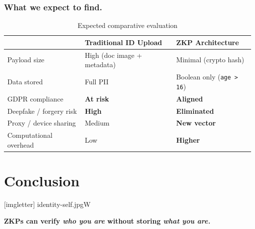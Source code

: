 \documentclass[aspectratio=169]{beamer}
\begin{document}
    \begin{frame}
        \frametitle{What we expect to find.}
        
        \begin{table}
            \small
            \begin{tabular}{p{3.8cm} p{3.6cm} p{3.6cm}}
                
                & \textbf{Traditional ID Upload} & \textbf{ZKP Architecture} \\
                \midrule
                Payload size                    & High (doc image + metadata)   & Minimal (crypto hash) \\
                \midrule
                Data stored         & Full PII                      & Boolean only (\texttt{age > 16}) \\
                \midrule
                GDPR compliance                 & \textcolor{hgpink}{\textbf{At risk}} & \textcolor{hgdarkgreen}{\textbf{Aligned}} \\
                \midrule
                Deepfake / forgery risk         & \textcolor{hgpink}{\textbf{High}}    & \textcolor{hgdarkgreen}{\textbf{Eliminated}} \\
                \midrule
                Proxy / device sharing          & Medium                        & \textcolor{hgorange}{\textbf{New vector}} \\
                \midrule
                Computational overhead          & Low                           & \textcolor{hgorange}{\textbf{Higher}} \\
                
            \end{tabular}
            \caption{Expected comparative evaluation}
        \end{table}
    \end{frame}
    
    
    \section{\textcolor{hgblue}{Conclusion}}
    
    {
        [imgletter]%
        {identity-self.jpg}{W}
        
        \begin{frame}
            
            {\huge \textbf{ZKPs can verify \textit{who you are} without storing \textit{what you are.}}}
            
           
           
            
        \end{frame}
    }
    
 
    
\end{document}
